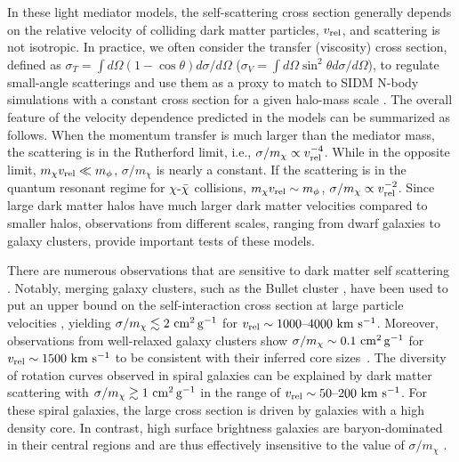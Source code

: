 In these light mediator models, the self-scattering cross section generally depends on the relative velocity of colliding dark matter particles, $v_{\rm rel}$, and scattering is not isotropic. In practice, we often consider the transfer (viscosity) cross section, defined as $\sigma_T = \int d\Omega(1-\cos\theta)d\sigma/d\Omega$ ($\sigma_V = \int d\Omega\sin^2\theta d\sigma/d\Omega$), to regulate small-angle scatterings and use them as a proxy to match to SIDM N-body simulations with a constant cross section for a given halo-mass scale \citep[][]{Tulin:2013teo,Kahlhoefer:2013dca}. The overall feature of the velocity dependence predicted in the models can be summarized as follows. When the momentum transfer is much larger than the mediator mass, the scattering is in the Rutherford limit, i.e., $\sigma/m_\chi\propto v^{-4}_{\rm rel}$. While in the opposite limit, $m_\chi v_{\rm rel}\ll m_\phi$, $\sigma/m_\chi$ is nearly a constant. If the scattering is in the quantum resonant regime for $\chi\textup{-}\bar{\chi}$ collisions, $m_\chi v_{\rm rel}\sim m_\phi$, $\sigma/m_\chi\propto v^{-2}_{\rm rel}$. Since large dark matter halos have much larger dark matter velocities compared to smaller halos, observations from different scales, ranging from dwarf galaxies to galaxy clusters, provide important tests of these models.


There are numerous observations that are sensitive to dark matter self scattering \citep[\eg,  Table 1 in][]{Tulin:2017ara}. Notably, merging galaxy clusters, such as the Bullet cluster  \citep{Randall:2007ph,2017MNRAS.465..569R}, have been used to put an upper bound on the self-interaction cross section at large particle velocities \citep[\eg,][]{Kahlhoefer:2013dca,Kahlhoefer:2015vua,Kim:2016ujt,Harvey:2016bqd,Robertson:2016qef,Wittman:2017gxn}, yielding $\sigma/m_\chi \lesssim 2 \mathrm{\,\mathrm{\,cm}^2\mathrm{\,g}^{-1}}$ for $v_{\rm rel} \sim 1000\textup{--}4000 \mathrm{\,\mathrm{\,km}\,\mathrm{\,s}^{-1}}$. Moreover, observations from well-relaxed galaxy clusters \citep{Newman++11,Newman:2013,Newman++13b} show $\sigma/m_\chi \sim 0.1 \mathrm{\,\mathrm{\,cm}^2\mathrm{\,g}^{-1}}$ for $v_{\rm rel} \sim 1500 \mathrm{\,\mathrm{\,km}\,\mathrm{\,s}^{-1}}$ to be consistent with their inferred core sizes~\citep{Kaplinghat:2015aga,Andrade:2019wzn}. The diversity of rotation curves observed in spiral galaxies can be explained by dark matter scattering with $\sigma/m_\chi \gtrsim 1 \mathrm{\,\mathrm{\,cm}^2\mathrm{\,g}^{-1}}$ in the range of $v_{\rm rel}\sim50\textup{--}200 \mathrm{\,\mathrm{\,km}\,\mathrm{\,s}^{-1}}$. For these spiral galaxies, the large cross section is driven by galaxies with a high density core. In contrast, high surface brightness galaxies are baryon-dominated in their central regions and are thus effectively insensitive to the value of $\sigma/m_\chi$ \citep{Kamada:2016euw,Ren:2018jpt}. 

